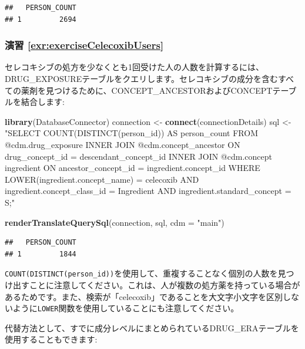 \documentclass[
  11pt]{book}
\newenvironment{Shaded}{\begin{snugshade}}{\end{snugshade}}
\newcommand{\AttributeTok}[1]{\textcolor[rgb]{0.13,0.29,0.53}{#1}}
\newcommand{\FunctionTok}[1]{\textcolor[rgb]{0.13,0.29,0.53}{\textbf{#1}}}
\newcommand{\NormalTok}[1]{#1}
\newcommand{\OtherTok}[1]{\textcolor[rgb]{0.56,0.35,0.01}{#1}}
\newcommand{\StringTok}[1]{\textcolor[rgb]{0.31,0.60,0.02}{#1}}
\theoremstyle{definition}
\theoremstyle{definition}
\theoremstyle{definition}
\theoremstyle{definition}
\theoremstyle{remark}
\begin{document}
\begin{verbatim}
##   PERSON_COUNT
## 1         2694
\end{verbatim}

\subsubsection*{演習 \ref{exr:exerciseCelecoxibUsers}}\label{ux6f14ux7fd2-refexrexercisecelecoxibusers}

セレコキシブの処方を少なくとも1回受けた人の人数を計算するには、DRUG\_EXPOSUREテーブルをクエリします。セレコキシブの成分を含むすべての薬剤を見つけるために、CONCEPT\_ANCESTORおよびCONCEPTテーブルを結合します:

\begin{Shaded}
\begin{Highlighting}[]
\FunctionTok{library}\NormalTok{(DatabaseConnector)}
\NormalTok{connection }\OtherTok{\textless{}{-}} \FunctionTok{connect}\NormalTok{(connectionDetails)}
\NormalTok{sql }\OtherTok{\textless{}{-}} \StringTok{"SELECT COUNT(DISTINCT(person\_id)) AS person\_count}
\StringTok{FROM @cdm.drug\_exposure}
\StringTok{INNER JOIN @cdm.concept\_ancestor}
\StringTok{  ON drug\_concept\_id = descendant\_concept\_id}
\StringTok{INNER JOIN @cdm.concept ingredient}
\StringTok{  ON ancestor\_concept\_id = ingredient.concept\_id}
\StringTok{WHERE LOWER(ingredient.concept\_name) = \textquotesingle{}celecoxib\textquotesingle{}}
\StringTok{  AND ingredient.concept\_class\_id = \textquotesingle{}Ingredient\textquotesingle{}}
\StringTok{  AND ingredient.standard\_concept = \textquotesingle{}S\textquotesingle{};"}

\FunctionTok{renderTranslateQuerySql}\NormalTok{(connection, sql, }\AttributeTok{cdm =} \StringTok{"main"}\NormalTok{)}
\end{Highlighting}
\end{Shaded}

\begin{verbatim}
##   PERSON_COUNT
## 1         1844
\end{verbatim}

\texttt{COUNT(DISTINCT(person\_id))}を使用して、重複することなく個別の人数を見つけ出すことに注意してください。これは、人が複数の処方薬を持っている場合があるためです。また、検索が「celecoxib」であることを大文字小文字を区別しないように\texttt{LOWER}関数を使用していることにも注意してください。

代替方法として、すでに成分レベルにまとめられているDRUG\_ERAテーブルを使用することもできます:
\end{document}
